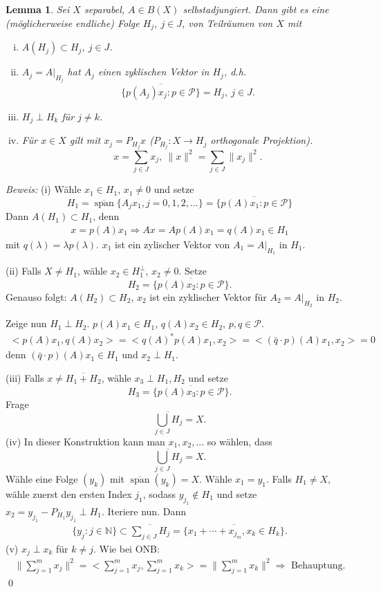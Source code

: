 \documentclass[12pt]{extreport} %
\newtheorem{Lemma}[Satz]{Lemma}
\DeclareMathOperator{\spann}{span}
\numberwithin{equation}{section}
\newcommand{\N}{\mathbb{N}} %
\newcommand{\m}{\cdot}
\newcommand{\Bew}{\emph{Beweis: }}
\begin{document}
	\begin{Lemma}
		Sei $X$ separabel, $A\in B(X)$ selbstadjungiert. Dann gibt es eine (möglicherweise endliche) Folge $H_j$, $j\in J$, von Teilräumen von $X$ mit 
		\begin{enumerate}[(i)]
			\item $A(H_j)\subset H_j$, $j\in J$.
			\item $A_j = A|_{H_j}$ hat $A_j$ einen zyklischen Vektor in $H_j$, d.h.
			$$\overline{\{p(A_j)x_j: p\in \mathcal{P} \}} = H_j,~ j\in J.$$
			\item $H_j\perp H_k$ für $j\neq k$.
			\item Für $x\in X$ gilt mit $x_j = P_{H_j}x$ ($P_{H_j}: X\rightarrow H_j$ orthogonale Projektion).
			$$x = \sum_{j\in J} x_j, ~ \|x\|^2 =\sum_{j\in J} \|x_j\|^2.$$
		\end{enumerate}
	\end{Lemma}
	
	\Bew (i) Wähle $x_1\in H_1$, $x_1\neq 0$ und setze
	$$H_1 = \overline{\spann}\{A_jx_1, j = 0,1,2,... \} = \overline{\{p(A)x_1:p\in \mathcal{P} \}}$$
	Dann $A(H_1) \subset H_1$, denn 
	\begin{align*}
		x = p(A)x_1\Rightarrow Ax = Ap(A)x_1 = q(A)x_1 \in H_1
	\end{align*}
	mit  $q(\lambda) = \lambda p(\lambda)$. $x_1$ ist ein zylischer Vektor von $A_1 = A|_{H_1}$ in $H_1$.
	
	(ii) Falls $X\neq H_1$, wähle $x_2\in H_1^{\perp}$, $x_2\neq 0$. Setze
	$$H_2=\overline{\{p(A)x_2: p\in \mathcal{P} \}}.$$
	Genauso folgt: $A(H_2)\subset H_2$, $x_2$ ist ein zyklischer Vektor für $A_2 = A|_{H_2}$ in $H_2$. 
	
	Zeige nun $H_1\perp H_2$. $p(A)x_1\in H_1$, $q(A)x_2 \in H_2$, $p,q\in \mathcal{P}$. 
	\begin{align*}
		<p(A)x_1, q(A)x_2> = <q(A)^* p(A)x_1,x_2> = <(\bar q\m p)(A)x_1,x_2> = 0
	\end{align*}
	denn $(\bar{q}\m p)(A)x_1 \in H_1$ und $x_2\perp H_1$.
	
	(iii) Falls $x\neq \overline{H_1+H_2}$, wähle $x_3\perp H_1,H_2$ und setze 
	$$H_3 = \overline{\{p(A)x_3:p\in \mathcal{P} \}}.$$
	Frage 
	$$\overline{\bigcup_{j\in J}H_j} = X.$$
	(iv) In dieser Konstruktion kann man $x_1,x_2,...$ so wählen, dass
	$$\overline{\bigcup_{j\in J}H_j} = X.$$
	Wähle eine Folge $(y_k)$ mit $\overline{\spann} (y_k) = X$. Wähle $x_1 = y_1$. Falls $H_1\neq X$, wähle zuerst den ersten Index $j_1$, sodass $y_{j_1}\notin H_1$ und setze $x_2 = y_{j_1} - P_{H_1}y_{j_1}\perp H_1$. Iteriere nun. Dann
	\begin{align*}
		\{y_j:j\in \N \}\subset \overline{\sum_{j\in J}H_j } = \overline{\{x_1+\cdots+x_{j_m}, x_k\in H_k \}}.
	\end{align*}
	(v) $x_j\perp x_k$ für $k\neq j$. Wie bei ONB:
	\begin{align*}
		\|\sum_{j = 1}^{m}x_j\|^2 = <\sum_{j = 1}^{m}x_j,\sum_{j = 1}^{m}x_k> = 	\|\sum_{j = 1}^{m}x_k\|^2 \Rightarrow \text{ Behauptung.}
	\end{align*}
	\qed
	
\end{document}
